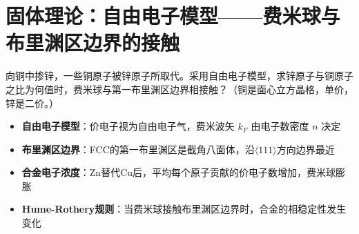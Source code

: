 \section{固体理论：自由电子模型——费米球与布里渊区边界的接触}
\label{sec:fermi-brillouin-contact}

\begin{modelbox}[题目：Cu-Zn合金中费米球与布里渊区边界接触的条件]
向铜中掺锌，一些铜原子被锌原子所取代。采用自由电子模型，求锌原子与铜原子之比为何值时，费米球与第一布里渊区边界相接触？（铜是面心立方晶格，单价，锌是二价。）
\end{modelbox}

\begin{tipbox}[考点快速分析]
\begin{itemize}
    \item \textbf{自由电子模型}：价电子视为自由电子气，费米波矢 $k_F$ 由电子数密度 $n$ 决定
    \item \textbf{布里渊区边界}：FCC的第一布里渊区是截角八面体，沿$\langle 111\rangle$方向边界最近
    \item \textbf{合金电子浓度}：Zn替代Cu后，平均每个原子贡献的价电子数增加，费米球膨胀
    \item \textbf{Hume-Rothery规则}：当费米球接触布里渊区边界时，合金的相稳定性发生变化
\end{itemize}
\end{tipbox}

